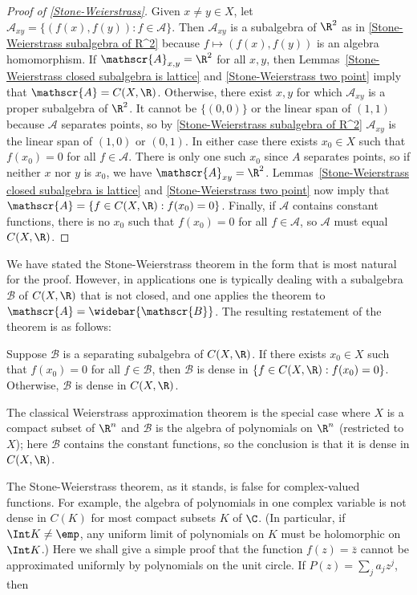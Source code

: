 \begin{proof}[Proof of \cref{Stone-Weierstrass}]
Given $x\neq y\in X$, let $\mathscr{A}_{xy}=\{(f(x),f(y)):f\in\mathscr{A}\}$. Then $\mathscr{A}_{xy}$ is a subalgebra of $\R^2$ as in \cref{Stone-Weierstrass subalgebra of R^2} because $f\mapsto(f(x),f(y))$ is an algebra homomorphism. If $\mathscr{A}_{x,y}=\R^2$ for all $x,y$, then Lemmas~\ref{Stone-Weierstrass closed subalgebra is lattice} and \ref{Stone-Weierstrass two point} imply that $\mathscr{A}=C(X,\R)$. Otherwise, there exist $x,y$ for which $\mathscr{A}_{xy}$ is a proper subalgebra of $\R^2$. It cannot be $\{(0,0)\}$ or the linear span of $(1,1)$ because $\mathscr{A}$ separates points, so by \cref{Stone-Weierstrass subalgebra of R^2} $\mathscr{A}_{xy}$ is the linear span of $(1,0)$ or $(0,1)$. In either case there exists $x_0\in X$ such that $f(x_0)=0$ for all $f\in\mathscr{A}$. There is only one such $x_0$ since $A$ separates points, so if neither $x$ nor $y$ is $x_0$, we have $\mathscr{A}_{xy}=\R^2$. Lemmas~\ref{Stone-Weierstrass closed subalgebra is lattice} and \ref{Stone-Weierstrass two point} now imply that $\mathscr{A}=\{f\in C(X,\R):f(x_0)=0\}$. Finally, if $\mathscr{A}$ contains constant functions, there is no $x_0$ such that $f(x_0)=0$ for all $f\in\mathscr{A}$, so $\mathscr{A}$ must equal $C(X,\R)$.
\end{proof}
We have stated the Stone-Weierstrass theorem in the form that is most natural for the proof. However, in applications one is typically dealing with a subalgebra $\mathscr{B}$ of $C(X,\R)$ that is not closed, and one applies the theorem to $\mathscr{A}=\widebar{\mathscr{B}}$. The resulting
restatement of the theorem is as follows:
\begin{corollary}
Suppose $\mathscr{B}$ is a separating subalgebra of $C(X,\R)$. If there exists $x_0\in X$ such that $f(x_0)=0$ for all $f\in\mathscr{B}$, then $\mathscr{B}$ is dense in $\{f\in C(X,\R):f(x_0)=0\}$. Otherwise, $\mathscr{B}$ is dense in $C(X,\R)$.
\end{corollary}
The classical Weierstrass approximation theorem is the special case where $X$ is a compact subset of $\R^n$ and $\mathscr{B}$ is the algebra of polynomials on $\R^n$ (restricted to $X$); here $\mathscr{B}$ contains the constant functions, so the conclusion is that it is dense in $C(X,\R)$.\par
The Stone-Weierstrass theorem, as it stands, is false for complex-valued functions. For example, the algebra of polynomials in one complex variable is not dense in $C(K)$ for most compact subsets $K$ of $\C$. (In particular, if $\Int K\neq\emp$, any uniform limit of polynomials on $K$ must be holomorphic on $\Int K$.) Here we shall give a simple proof that the function $f(z)=\bar{z}$ cannot be approximated uniformly by polynomials on the unit circle. If $P(z)=\sum_ja_jz^j$, then
